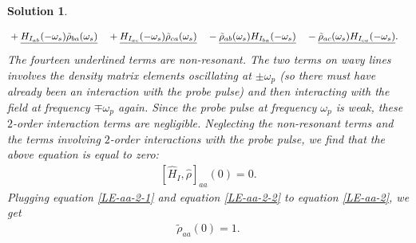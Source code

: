 \documentclass[UTF8,10pt,a4paper]{article}
\theoremstyle{Problem}
\theoremstyle{Solution}
\newtheorem*{sol}{Solution}
\begin{document}
\begin{sol}
\begin{enumerate}
\begin{align}
            &+\uline{H_{I_{ab}}(-\omega_s)\tilde{\rho}_{ba}(\omega_s)}&&+\uline{H_{I_{ac}}(-\omega_s)\tilde{\rho}_{ca}(\omega_s)}&&-\uline{\tilde{\rho}_{ab}(\omega_s)H_{I_{ba}}(-\omega_s)}&&-\uline{\tilde{\rho}_{ac}(\omega_s)H_{I_{ca}}(-\omega_s)}.
        \end{align}
        The fourteen underlined terms are non-resonant. The two terms on wavy lines involves the density matrix elements oscillating at $\pm\omega_p$ (so there must have already been an interaction with the probe pulse) and then interacting with the field at frequency $\mp\omega_p$ again. Since the probe pulse at frequency $\omega_p$ is weak, these $2$-order interaction terms are negligible. Neglecting the non-resonant terms and the terms involving $2$-order interactions with the probe pulse, we find that the above equation is equal to zero:
        \begin{align}
            \label{LE-aa-2-2}
            [\hat{H}_I,\hat{\rho}]_{aa}(0)=0.
        \end{align}
        Plugging equation \eqref{LE-aa-2-1} and equation \eqref{LE-aa-2-2} to equation \eqref{LE-aa-2}, we get
        \begin{align}
            \label{LE-aa-3}
            \boxed{\tilde{\rho}_{aa}(0)=1.}
        \end{align}

\end{enumerate}
\end{sol}
\end{document}
